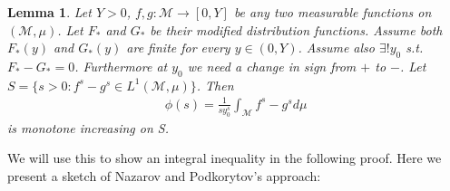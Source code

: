 \documentclass[10pt]{article}
\newcommand{\1}{\textbf{1}}
\newtheorem{lemma}[theorem]{Lemma}
\theoremstyle{remark}
\theoremstyle{definition}
\begin{document}
\begin{lemma}
	Let $Y > 0$, $f,g : \mathcal{M} \to [0,Y]$ be any two measurable functions on $(\mathcal{M},\mu)$. Let $F_*$ and $G_*$ be their modified distribution functions. Assume both $F_*(y)$ and $G_*(y)$ are finite for every $y \in (0,Y)$. Assume also $\exists ! y_0$ s.t. $F_*-G_* = 0$. Furthermore at $y_0$ we need a change in sign from $+$ to $-$. Let $S = \{s > 0: f^s - g^s \in L^1(\mathcal{M},\mu)\}$. Then
	\begin{align*}
		\phi(s) = \frac{1}{sy_0^s}\int_{\mathcal{M}}f^s - g^s d\mu
	\end{align*}
	is monotone increasing on S. 
\end{lemma}


We will use this to show an integral inequality in the following proof. Here we present a sketch of Nazarov and Podkorytov's approach:
\end{document}
